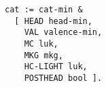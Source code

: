 \documentclass[a4paper]{article}
\begin{document}
{\small\begin{verbatim}
cat := cat-min &
  [ HEAD head-min,
    VAL valence-min,
    MC luk,
    MKG mkg,
    HC-LIGHT luk,
    POSTHEAD bool ].
\end{verbatim}}
\end{document}
